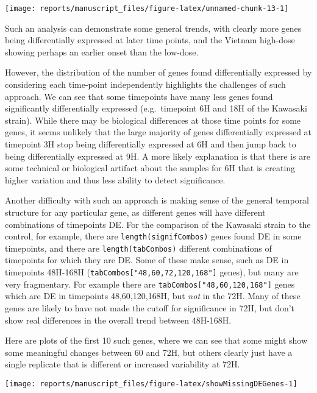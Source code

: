 \documentclass[9pt,a4paper,]{extarticle}
\begin{document}
\begin{center}\texttt{[image: reports/manuscript\_files/figure-latex/unnamed-chunk-13-1]} \end{center}

Such an analysis can demonstrate some general trends, with clearly more genes
being differentially expressed at later time points, and the Vietnam high-dose
showing perhaps an earlier onset than the low-dose.

However, the distribution of the number of genes found differentially
expressed by considering each time-point independently highlights the
challenges of such approach. We can see that some timepoints have many less
genes found significantly differentially expressed (e.g.~timepoint 6H and 18H
of the Kawasaki strain). While there may be biological differences at those
time points for some genes, it seems unlikely that the large majority of genes
differentially expressed at timepoint 3H stop being differentially expressed
at 6H and then jump back to being differentially expressed at 9H. A more
likely explanation is that there is are some technical or biological artifact
about the samples for 6H that is creating higher variation and thus less
ability to detect significance.

Another difficulty with such an approach is making sense of the general
temporal structure for any particular gene, as different genes will have
different combinations of timepoints DE. For the comparison of the Kawasaki
strain to the control, for example, there are \texttt{length(signifCombos)} genes
found DE in some timepoints, and there are \texttt{length(tabCombos)} different
combinations of timepoints for which they are DE. Some of these make sense,
such as DE in timepoints 48H-168H (\texttt{tabCombos{[}"48,60,72,120,168"{]}} genes), but
many are very fragmentary. For example there are \texttt{tabCombos{[}"48,60,120,168"{]}}
genes which are DE in timepoints 48,60,120,168H, but \emph{not} in the 72H. Many of
these genes are likely to have not made the cutoff for significance in 72H,
but don't show real differences in the overall trend between 48H-168H.

Here are plots of the first 10 such genes, where we can see that some might
show some meaningful changes between 60 and 72H, but others clearly just have
a single replicate that is different or increased variability at 72H.

\begin{center}\texttt{[image: reports/manuscript\_files/figure-latex/showMissingDEGenes-1]} \end{center}
\end{document}
